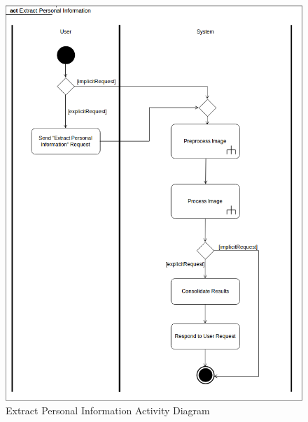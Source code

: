 \documentclass{article}
\begin{document}
	\begin{figure}[h]
		\centering
		\includegraphics[scale=0.5]{img/extract_personal_info_activity.png}
		\caption{Extract Personal Information Activity Diagram}
	\end{figure}
\pagebreak
\end{document}
